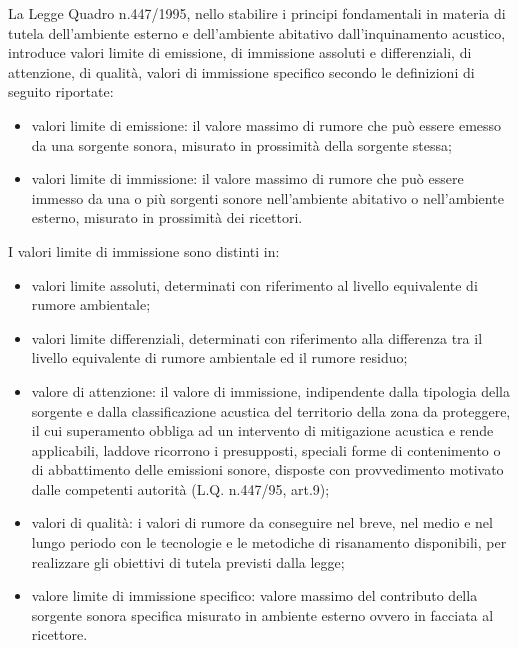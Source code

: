 La Legge Quadro n.447/1995, nello stabilire i principi fondamentali in materia di tutela dell'ambiente esterno e dell'ambiente abitativo dall'inquinamento acustico, introduce valori limite di emissione, di immissione assoluti e differenziali, di attenzione, di qualità, valori di immissione specifico secondo le definizioni di seguito riportate:
\begin{itemize}
\item valori limite di emissione: il valore massimo di rumore che può essere emesso da una sorgente sonora, misurato in prossimità della sorgente stessa;
\item valori limite di immissione: il valore massimo di rumore che può essere immesso da una o più sorgenti sonore nell'ambiente abitativo o nell'ambiente esterno, misurato in prossimità dei ricettori. 
\end{itemize}

I valori limite di immissione sono distinti in:
\begin{itemize}
\item valori limite assoluti, determinati con riferimento al livello equivalente di rumore ambientale;
\item valori limite differenziali, determinati con riferimento alla differenza tra il livello equivalente di rumore ambientale ed il rumore residuo;
\end{itemize}

\begin{itemize}
\item valore di attenzione: il valore di immissione, indipendente dalla tipologia della sorgente e dalla classificazione acustica del territorio della zona da proteggere, il cui superamento obbliga ad un intervento di mitigazione acustica e rende applicabili, laddove ricorrono i presupposti, speciali forme di contenimento o di abbattimento delle emissioni sonore, disposte con provvedimento motivato dalle competenti autorità (L.Q. n.447/95, art.9);
\item valori di qualità: i valori di rumore da conseguire nel breve, nel medio e nel lungo periodo con le tecnologie e le metodiche di risanamento disponibili, per realizzare gli obiettivi di tutela previsti dalla legge;
\item valore limite di immissione specifico: valore massimo del contributo della sorgente sonora specifica misurato in ambiente esterno ovvero in facciata al ricettore.
\end{itemize}

